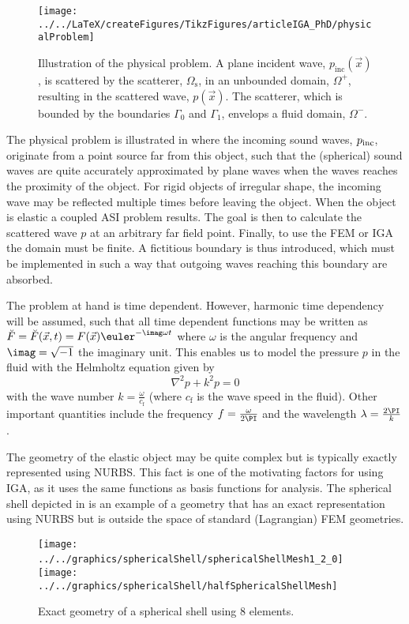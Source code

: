 \begin{figure}
	\centering
	\texttt{[image: ../../LaTeX/createFigures/TikzFigures/articleIGA\_PhD/physicalProblem]}
	\caption[Illustration of the physical problem]{Illustration of the physical problem. A plane incident wave, $p_{\mathrm{inc}}(\vec{x})$, is scattered by the scatterer, $\Omega_{\mathrm{s}}$, in an unbounded domain, $\Omega^+$, resulting in the scattered wave, $p(\vec{x})$. The scatterer, which is bounded by the boundaries $\Gamma_0$ and $\Gamma_1$, envelops a fluid domain, $\Omega^-$.}
	\label{Fig2:physicalProblem}
\end{figure}
The physical problem is illustrated in  where the incoming sound waves, $p_{\rm inc}$, originate from a point source far from this object, such that the (spherical) sound waves are quite accurately approximated by plane waves when the waves reaches the proximity of the object. For rigid objects of irregular shape, the incoming wave may be reflected multiple times before leaving the object. When the object is elastic a coupled ASI problem results. The goal is then to calculate the scattered wave $p$ at an arbitrary far field point. Finally, to use the FEM or IGA the domain must be finite. A fictitious boundary is thus introduced, which must be implemented in such a way that outgoing waves reaching this boundary are absorbed.


The problem at hand is time dependent. However, harmonic time dependency will be assumed, such that all time dependent functions may be written as ${\breve{F}=\breve{F}(\vec{x},t) = F(\vec{x})\euler^{-\imag\omega t}}$ where $\omega$ is the angular frequency and $\imag = \sqrt{-1}$ the imaginary unit. This enables us to model the pressure $p$ in the fluid with the Helmholtz equation given by
\begin{equation}\label{Eq2:HelmholtzEquationIntro}
	\nabla^2 p + k^2 p = 0
\end{equation}
with the wave number $k=\frac{\omega}{c_{\mathrm{f}}}$ (where $c_{\mathrm{f}}$ is the wave speed in the fluid). Other important quantities include the frequency $f=\frac{\omega}{2\PI}$ and the wavelength $\lambda = \frac{2\PI}{k}$.

The geometry of the elastic object may be quite complex but is typically exactly represented using NURBS. This fact is one of the motivating factors for using IGA, as it uses the same functions as basis functions for analysis. The spherical shell depicted in  is an example of a geometry that has an exact representation using NURBS but is outside the space of standard (Lagrangian) FEM geometries.
\begin{figure}
	\centering
	\texttt{[image: ../../graphics/sphericalShell/sphericalShellMesh1\_2\_0]}
	~
	\texttt{[image: ../../graphics/sphericalShell/halfSphericalShellMesh]}
	\caption[Exact geometry of a spherical shell using 8 elements]{Exact geometry of a spherical shell using 8 elements.}
	\label{Fig2:SphericalShell}
\end{figure}

